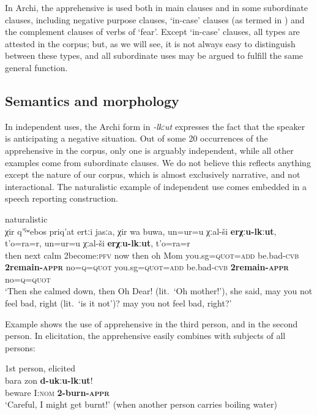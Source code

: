 \documentclass[output=paper,colorlinks,citecolor=brown]{langscibook}
\begin{document}
In Archi, the apprehensive is used both in main clauses and in some subordinate clauses, including negative purpose clauses, `in-case' clauses (as termed in \citealt{lichtenberk1995}) and the complement clauses of verbs of `fear'. Except `in-case' clauses, all types are attested in the corpus; but, as we will see, it is not always easy to distinguish between these types, and all subordinate uses may be argued to fulfill the same general function.



\subsection{Semantics and morphology}
\label{subsec:Asemmorph}

In independent uses, the Archi form in \textit{-lkːut} expresses the fact that the speaker is anticipating a negative situation. Out of some 20 occurrences of the apprehensive in the corpus, only one is arguably independent, while all other examples come from subordinate clauses. We do not believe this reflects anything except the nature of our corpus, which is almost exclusively narrative, and not interactional. The naturalistic example of independent use comes embedded in a speech reporting construction. 


\ea \label{ex:DD2} \textnormal{naturalistic} \\
\gll χir q'ˁʷebos priq'at e{\textlangle}r{\textrangle}tːi jasːa, χir wa buwa, un=ur=u χːal-ši \textbf{e{\textlangle}r{\textrangle}χːu-lkːut}, t'o=ra=r, un=ur=u χːal-ši \textbf{e{\textlangle}r{\textrangle}χːu-lkːut}, t'o=ra=r  \\
then next calm {\textlangle}2{\textrangle}become:\textsc{pfv} now then oh Mom you.sg\textsc{=quot=add} be.bad-\textsc{cvb} \textbf{{\textlangle}2{\textrangle}remain\textsc{-appr}} no=\textsc{q=quot} you.sg\textsc{=quot=add} be.bad-\textsc{cvb} \textbf{{\textlangle}2{\textrangle}remain\textsc{-appr}} no=\textsc{q=quot} \\
\glt `Then she calmed down, then Oh Dear! (lit.\ `Oh mother!'), she said, may you not feel bad, right (lit.\ `is it not')? may you not feel bad, right?'
\z

 Example  shows the use of apprehensive in the third person, and  in the second person. In elicitation, the apprehensive easily combines with subjects of all persons:
 
\ea \label{ex:DD3} \textnormal{1st person, elicited} \\
\gll bara zon \textbf{d-ukːu-lkːut}! \\
beware I:\textsc{nom} \textbf{2-burn-\textsc{appr}} \\
\glt `Careful, I might get burnt!' (when another person carries boiling water)
\z
\end{document}
